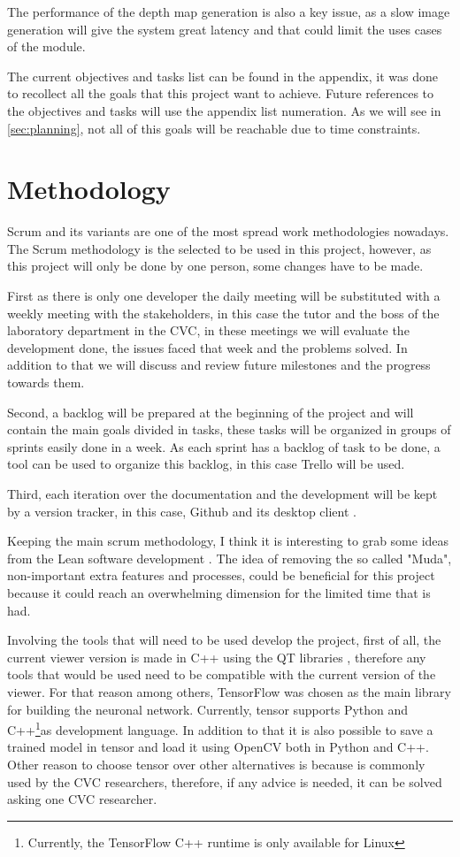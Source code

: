 \documentclass[10pt,a4paper,twocolumn,twoside]{article}
\begin{document}
	The performance of the depth map generation is also a key issue, as a slow image generation will give the system great latency and that could limit the uses cases of the module. 
	
	The current objectives and tasks list can be found in the appendix, it was done to recollect all the goals that this project want to achieve. Future references to the objectives and tasks will use the appendix list numeration. As we will see in \ref{sec:planning}, not all of this goals will be reachable due to time constraints.
	
	\section{Methodology}
	Scrum and its variants are one of the most spread work methodologies nowadays.
	The Scrum methodology is the selected to be used in this project, however, as this project will only be done by one person, some changes have to be made. 
	
	First as there is only one developer the daily meeting will be substituted with a weekly meeting with the stakeholders, in this case the tutor and the boss of the laboratory department in the CVC, in these meetings we will evaluate the development done, the issues faced that week and the problems solved. In addition to that we will discuss and review future milestones and the progress towards them.
	
	Second, a backlog will be prepared at the beginning of the project and will contain the main goals divided in tasks, these tasks will be organized in groups of sprints easily done in a week. As each sprint has a backlog of task to be done, a tool can be used to organize this backlog, in this case Trello\cite{web:trello} will be used.
	
	Third, each iteration over the documentation and the development will be kept by a version tracker, in this case, Github \cite{web:github} and its desktop client \cite{web:githubDesktop}. 
	
	Keeping the main scrum methodology, I think it is interesting to grab some ideas from the Lean software development \cite{web:leanMethod}. The idea of removing the so called "Muda", non-important extra features and processes, could be beneficial for this project because it could reach an overwhelming dimension for the limited time that is had.
	
	Involving the tools that will need to be used develop the project, first of all, the current viewer version is made in C++ using the QT libraries \cite{web:qt}, therefore any tools that would be used need to be compatible with the current version of the viewer. For that reason among others, TensorFlow\cite{web:tensor} was chosen as the main library for building the neuronal network. Currently, tensor supports  Python and C++\footnote{Currently, the TensorFlow C++ runtime is only available for Linux}as development language. In addition to that it is also possible to save a trained model in tensor and load it using OpenCV both in Python and C++. Other reason to choose tensor over other alternatives is because is commonly used by the CVC researchers, therefore, if any advice is needed, it can be solved asking one CVC researcher.
	
\end{document}
